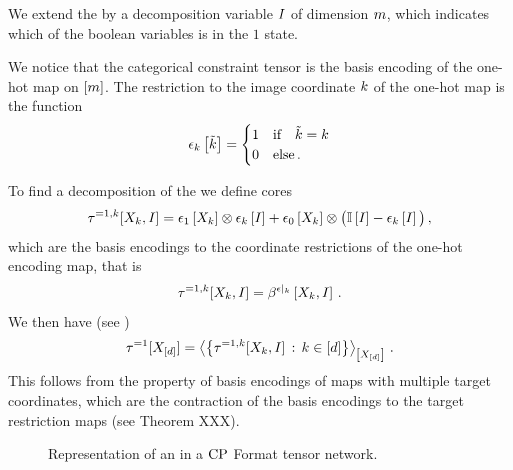 We extend the \eoconword by a decomposition variable $I$ of dimension $m$, which indicates which of the boolean variables is in the $1$ state.


We notice that the categorical constraint tensor is the basis encoding of the one-hot map on $[m]$.
The restriction to the image coordinate $k$ of the one-hot map is the function
\begin{align*}
    \epsilon_{k}\left[\tilde{k}\right]
    = \begin{cases}
          1 & \text{if}\quad \tilde{k}=k \\
          0 & \text{else} \, .
    \end{cases}
\end{align*}

To find a decomposition of the \eoconword we define cores
\begin{align*}
    \tau^{=1,k}[X_{k},I]
    = \epsilon_{1}\left[X_{k}\right] \otimes \epsilon_{k}\left[I\right]
    + \epsilon_{0}\left[X_{k}\right] \otimes \big(\mathbb{I}\left[I\right]- \epsilon_{k}\left[I\right]\big) \, ,
\end{align*}
which are the basis encodings to the coordinate restrictions of the one-hot encoding map, that is
\begin{align*}
    \exactlyoneconofat{\catenumerator}{\catvariableof{\catenumerator},\decvariable}
    = \bencodingofat{\restrictionofto{\onehotmap}{\catenumerator}}{\catvariableof{\catenumerator},\decvariable} \, .
\end{align*}
We then have (see )
\begin{align*}
    \tau^{=1}[X_{[d]}]
    = \left\langle \left\{\tau^{=1,k}[X_{k},I]
                         \,:\, k\in[d] \right\}\right\rangle_{\left[ X_{[d]} \right]} \, .
\end{align*}
This follows from the property of basis encodings of maps with multiple target coordinates, which are the contraction of the basis encodings to the target restriction maps (see Theorem XXX).


\begin{figure}[t]
    \begin{center}
        
    \end{center}
    \caption{Representation of an \eoconword in a $\mathrm{CP}$ Format tensor network.
    }
    \label{fig:eoconDecomposition}
\end{figure}

